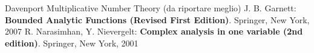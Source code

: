 \begin{thebibliography}{widest entry}
   Davenport Multiplicative Number Theory (da riportare meglio)
   J. B. Garnett: \textbf{Bounded Analytic Functions (Revised First Edition)}. Springer, New York, 2007
   R. Narasimhan, Y. Nievergelt: \textbf{Complex analysis in one variable (2nd edition)}. Springer, New York, 2001
\end{thebibliography}
